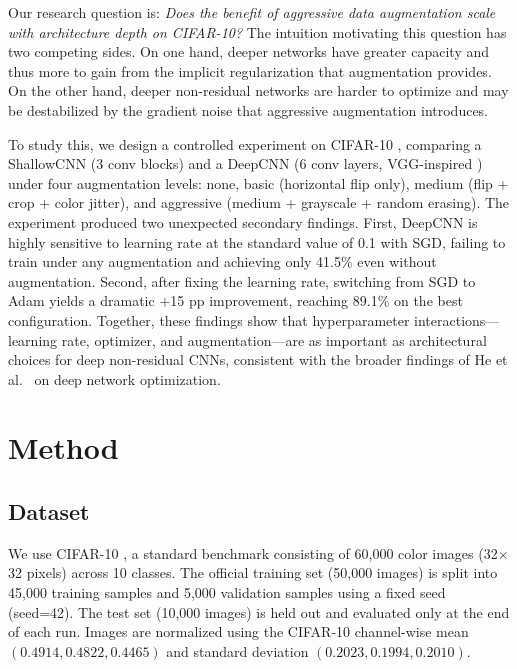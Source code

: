 \documentclass[11pt,letterpaper]{article}
\begin{document}
Our research question is: \textit{Does the benefit of aggressive data augmentation scale with
architecture depth on CIFAR-10?} The intuition motivating this question has two competing
sides. On one hand, deeper networks have greater capacity and thus more to gain from the
implicit regularization that augmentation provides. On the other hand, deeper non-residual
networks are harder to optimize and may be destabilized by the gradient noise that aggressive
augmentation introduces.

To study this, we design a controlled experiment on CIFAR-10 \cite{krizhevsky2009learning},
comparing a ShallowCNN (3 conv blocks) and a DeepCNN (6 conv layers, VGG-inspired
\cite{simonyanvery}) under four augmentation levels: none, basic (horizontal flip only), medium
(flip + crop + color jitter), and aggressive (medium + grayscale + random erasing). The
experiment produced two unexpected secondary findings. First, DeepCNN is highly sensitive to
learning rate at the standard value of 0.1 with SGD, failing to train under any augmentation
and achieving only 41.5\% even without augmentation. Second, after fixing the learning rate,
switching from SGD to Adam yields a dramatic +15 pp improvement, reaching 89.1\% on the best
configuration. Together, these findings show that hyperparameter interactions---learning rate,
optimizer, and augmentation---are as important as architectural choices for deep non-residual
CNNs, consistent with the broader findings of He et al.\ \cite{he2016deep} on deep network
optimization.

\section{Method}

\subsection{Dataset}

We use CIFAR-10 \cite{krizhevsky2009learning}, a standard benchmark consisting of 60,000
color images (32$\times$32 pixels) across 10 classes. The official training set (50,000
images) is split into 45,000 training samples and 5,000 validation samples using a fixed
seed (seed=42). The test set (10,000 images) is held out and evaluated only at the end of
each run. Images are normalized using the CIFAR-10 channel-wise mean $(0.4914, 0.4822, 0.4465)$
and standard deviation $(0.2023, 0.1994, 0.2010)$.
\end{document}
